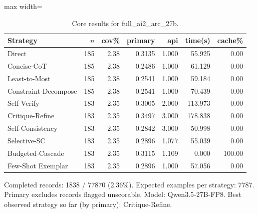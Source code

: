 \documentclass[10pt,twocolumn]{article}
\begin{document}
\begin{table}[t]
\centering
\caption{Core results for full\_ai2\_arc\_27b.}
\label{tab:full_ai2_arc_27b_core}
\begin{adjustbox}{max width=\textwidth}
\begin{tabular}{lrrrrrr}
\toprule
Strategy & $n$ & cov\% & primary & api & time(s) & cache\% \\
\midrule
Direct & 185 & 2.38 & 0.3135 & 1.000 & 55.925 & 0.00 \\
Concise-CoT & 185 & 2.38 & 0.2486 & 1.000 & 61.129 & 0.00 \\
Least-to-Most & 185 & 2.38 & 0.2541 & 1.000 & 59.184 & 0.00 \\
Constraint-Decompose & 185 & 2.38 & 0.2541 & 1.000 & 70.439 & 0.00 \\
Self-Verify & 183 & 2.35 & 0.3005 & 2.000 & 113.973 & 0.00 \\
Critique-Refine & 183 & 2.35 & 0.3497 & 3.000 & 178.838 & 0.00 \\
Self-Consistency & 183 & 2.35 & 0.2842 & 3.000 & 50.998 & 0.00 \\
Selective-SC & 183 & 2.35 & 0.2896 & 1.077 & 55.039 & 0.00 \\
Budgeted-Cascade & 183 & 2.35 & 0.3115 & 1.109 & 0.000 & 100.00 \\
Few-Shot Exemplar & 183 & 2.35 & 0.2896 & 1.000 & 57.056 & 0.00 \\
\bottomrule
\end{tabular}
\end{adjustbox}
\vspace{2pt}\parbox{0.98\textwidth}{\footnotesize Completed records: 1838 / 77870 (2.36\%). Expected examples per strategy: 7787. Primary excludes records flagged unscorable. Model: Qwen3.5-27B-FP8. Best observed strategy so far (by primary): Critique-Refine.}
\end{table}
\end{document}
